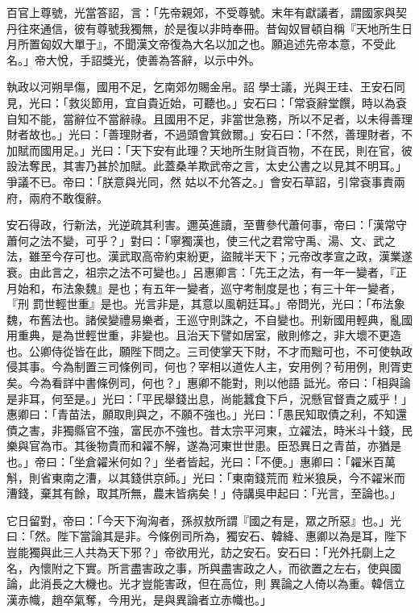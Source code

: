 \begin{pinyinscope}
 百官上尊號，光當答詔，言：「先帝親郊，不受尊號。末年有獻議者，謂國家與契丹往來通信，彼有尊號我獨無，於是復以非時奉冊。昔匈奴冒頓自稱『天地所生日月所置匈奴大單于』，不聞漢文帝復為大名以加之也。願追述先帝本意，不受此名。」帝大悅，手詔獎光，使善為答辭，以示中外。



 執政以河朔旱傷，國用不足，乞南郊勿賜金帛。詔
 學士議，光與王珪、王安石同見，光曰：「救災節用，宜自貴近始，可聽也。」安石曰：「常袞辭堂饌，時以為袞自知不能，當辭位不當辭祿。且國用不足，非當世急務，所以不足者，以未得善理財者故也。」光曰：「善理財者，不過頭會箕斂爾。」安石曰：「不然，善理財者，不加賦而國用足。」光曰：「天下安有此理？天地所生財貨百物，不在民，則在官，彼設法奪民，其害乃甚於加賦。此蓋桑羊欺武帝之言，太史公書之以見其不明耳。」爭議不已。帝曰：「朕意與光同，然
 姑以不允答之。」會安石草詔，引常袞事責兩府，兩府不敢復辭。



 安石得政，行新法，光逆疏其利害。邇英進讀，至曹參代蕭何事，帝曰：「漢常守蕭何之法不變，可乎？」對曰：「寧獨漢也，使三代之君常守禹、湯、文、武之法，雖至今存可也。漢武取高帝約束紛更，盜賊半天下；元帝改孝宣之政，漢業遂衰。由此言之，祖宗之法不可變也。」呂惠卿言：「先王之法，有一年一變者，『正月始和，布法象魏』是也；有五年一變者，巡守考制度是也；有三十年一變者，『刑
 罰世輕世重』是也。光言非是，其意以風朝廷耳。」帝問光，光曰：「布法象魏，布舊法也。諸侯變禮易樂者，王巡守則誅之，不自變也。刑新國用輕典，亂國用重典，是為世輕世重，非變也。且治天下譬如居室，敝則修之，非大壞不更造也。公卿侍從皆在此，願陛下問之。三司使掌天下財，不才而黜可也，不可使執政侵其事。今為制置三司條例司，何也？宰相以道佐人主，安用例？茍用例，則胥吏矣。今為看詳中書條例司，何也？」惠卿不能對，則以他語
 詆光。帝曰：「相與論是非耳，何至是。」光曰：「平民舉錢出息，尚能蠶食下戶，況懸官督責之威乎！」惠卿曰：「青苗法，願取則與之，不願不強也。」光曰：「愚民知取債之利，不知還債之害，非獨縣官不強，富民亦不強也。昔太宗平河東，立糴法，時米斗十錢，民樂與官為市。其後物貴而和糴不解，遂為河東世世患。臣恐異日之青苗，亦猶是也。」帝曰：「坐倉糴米何如？」坐者皆起，光曰：「不便。」惠卿曰：「糴米百萬斛，則省東南之漕，以其錢供京師。」光曰：「東南錢荒而
 粒米狼戾，今不糴米而漕錢，棄其有餘，取其所無，農末皆病矣！」侍講吳申起曰：「光言，至論也。」



 它日留對，帝曰：「今天下洶洶者，孫叔敖所謂『國之有是，眾之所惡』也。」光曰：「然。陛下當論其是非。今條例司所為，獨安石、韓絳、惠卿以為是耳，陛下豈能獨與此三人共為天下邪？」帝欲用光，訪之安石。安石曰：「光外托劘上之名，內懷附之下實。所言盡害政之事，所與盡害政之人，而欲置之左右，使與國論，此消長之大機也。光才豈能害政，但在高位，則
 異論之人倚以為重。韓信立漢赤幟，趙卒氣奪，今用光，是與異論者立赤幟也。」




\end{pinyinscope}
